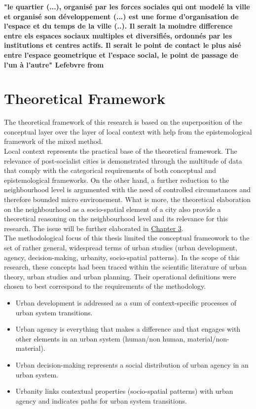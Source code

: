 \documentclass[11pt]{report}
\begin{document}
\textbf{"le quartier (...), organisé par les forces sociales qui ont modelé la ville et organisé son développement (...) est une forme d'organisation de l'espace et du temps de la ville (..). Il serait la moindre difference entre els espaces sociaux multiples et diversifiés, ordonnés par les institutions et centres actifs. Il serait le point de contact le plus aisé entre l'espace geometrique et l'espace social, le point de passage de l'un à l'autre" Lefebvre from \href{Merlin}{\citealt{choay_dictionnaire_2010}}}

\section{Theoretical Framework}

The theoretical framework of this research is based on the superposition of the conceptual layer over the layer of local context with help from the epistemological framework of the mixed method.
\\

Local context represents the practical base of the theoretical framework.
The relevance of post-socialist cities is demonstrated through the multitude of data that comply with the categorical requirements of both conceptual and epistemological frameworks.
On the other hand, a further reduction to the neighbourhood level is argumented with the need of controlled circumstances and therefore bounded micro environement. What is more, the theoretical elaboration on the neighbourhood as a socio-spatial element of a city also provide a theoretical reasoning on the neighbourhood level and its relevance for this research. The issue will be further elaborated in \href{Chapter 3}{Chapter 3}.
\\

The methodological focus of this thesis limited the conceptual frameowork to the set of rather general, widespread terms of urban studies (urban development, agency, decision-making, urbanity, socio-spatial patterns).
In the scope of this research, these concepts had been traced within the scientific literature of urban theory, urban studies and urban planning. Their operational definitions were chosen to best correspond to the requirements of the methodology.

\begin{itemize}
\item Urban development is addressed as a sum of context-specific processes of urban system transitions.
\item Urban agency is everything that makes a difference and that engages with other elements in an urban system (human/non human, material/non-material).
\item Urban decision-making represents a social distribution of urban agency in an urban system.
\item Urbanity links contextual properties (socio-spatial patterns) with urban agency and indicates paths for urban system transitions.
\end{itemize}
\end{document}
